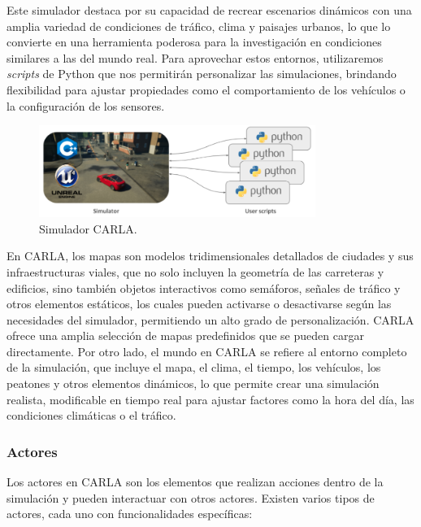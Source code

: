 Este simulador destaca por su capacidad de recrear escenarios dinámicos con una amplia variedad de condiciones de tráfico, clima y paisajes urbanos, lo que lo convierte en una herramienta poderosa para la investigación en condiciones similares a las del mundo real. Para aprovechar estos entornos, utilizaremos \textit{scripts} de Python que nos permitirán personalizar las simulaciones, brindando flexibilidad para ajustar propiedades como el comportamiento de los vehículos o la configuración de los sensores.

\begin{figure}[ht]
  \begin{center}
    \includegraphics[width=9cm]{figs/Plataformas_Desarollo/carla.png}
  \end{center}
  \caption{Simulador CARLA.}
  \label{carla}
\end{figure}

En CARLA, los mapas son modelos tridimensionales detallados de ciudades y sus infraestructuras viales, que no solo incluyen la geometría de las carreteras y edificios, sino también objetos interactivos como semáforos, señales de tráfico y otros elementos estáticos, los cuales pueden activarse o desactivarse según las necesidades del simulador, permitiendo un alto grado de personalización. CARLA ofrece una amplia selección de mapas predefinidos que se pueden cargar directamente. Por otro lado, el mundo en CARLA se refiere al entorno completo de la simulación, que incluye el mapa, el clima, el tiempo, los vehículos, los peatones y otros elementos dinámicos, lo que permite crear una simulación realista, modificable en tiempo real para ajustar factores como la hora del día, las condiciones climáticas o el tráfico.

\subsubsection{Actores}

Los actores en CARLA son los elementos que realizan acciones dentro de la simulación y pueden interactuar con otros actores. Existen varios tipos de actores, cada uno con funcionalidades específicas:

